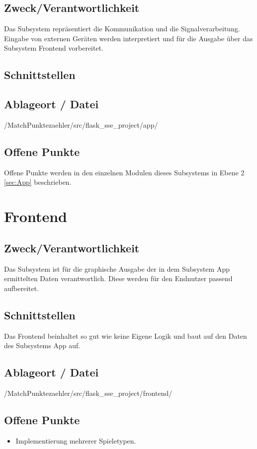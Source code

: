 \subsection*{Zweck/Verantwortlichkeit}
Das Subsystem repräsentiert die Kommunikation und  die Signalverarbeitung. Eingabe von externen Geräten werden interpretiert und für die Ausgabe über das Subsystem Frontend vorbereitet.
\subsection*{Schnittstellen}
\subsection*{Ablageort / Datei}
/MatchPunktezaehler/src/flask\_sse\_project/app/
\subsection*{Offene Punkte}
Offene Punkte werden in den einzelnen Modulen dieses Subsystems in Ebene 2 \ref{sec:App} beschrieben.

\section{Frontend}
\subsection*{Zweck/Verantwortlichkeit}
Das Subsystem ist für die graphische Ausgabe der in dem Subsystem App ermittelten Daten verantwortlich. Diese werden für den Endnutzer passend aufbereitet.
\subsection*{Schnittstellen}
Das Frontend beinhaltet so gut wie keine Eigene Logik und baut auf den Daten des Subsystems App auf.
\subsection*{Ablageort / Datei}
/MatchPunktezaehler/src/flask\_sse\_project/frontend/
\subsection*{Offene Punkte}
\begin{itemize}
	\item Implementierung mehrerer Spieletypen.
\end{itemize}

